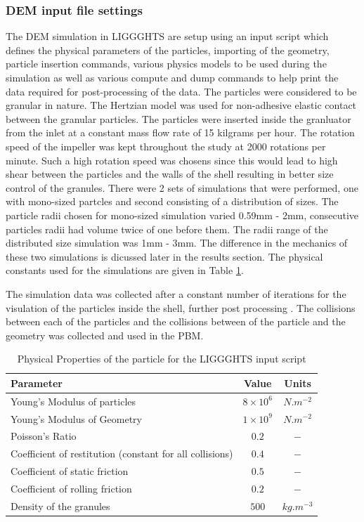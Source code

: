 \documentclass[preprint,11pt,authoryear]{elsarticle}
\begin{document}
\subsubsection{DEM input file settings}
\par The DEM simulation in LIGGGHTS are setup using an input script which defines the physical parameters of the particles, importing of the geometry, particle insertion commands, various physics models to be used during the simulation as well as various compute and dump commands to help print the data required for post-processing of the data. The particles were considered to be granular in nature. The Hertzian model was used for non-adhesive elastic contact between the granular particles. The particles were inserted inside the granluator from the inlet at a constant mass flow rate of 15 kilgrams per hour. The rotation speed of the impeller was kept throughout the study at 2000 rotations per minute. Such a high rotation speed was chosens since this would lead to high shear between the particles and the walls of the shell resulting in better size control of the granules. There were 2 sets of simulations that were performed, one with mono-sized partcles and second consisting of a distribution of sizes. The particle radii chosen for mono-sized simulation varied 0.59mm - 2mm, consecutive particles radii had volume twice of one before them. The radii range of the distributed size simulation was 1mm - 3mm. The difference in the mechanics of these two simulations is dicussed later in the results section. The physical constants used for the simulations are given in Table \ref{table:mthds_dem_input}.
\par The simulation data was collected after a constant number of iterations for the visulation of the particles inside the shell, further post processing . The collisions between each of the particles and the collisions between of the particle and the geometry was collected and used in the PBM. 

\begin{table}[!htb]%
\caption{Physical Properties of the particle for the LIGGGHTS input script} \label{table:mthds_dem_input}
\begin{center}
\begin{tabular}{l|c|c}
\hline
\bf{Parameter} &\bf{Value} &\bf{Units}\\
\hline
Young's Modulus of particles  & $8 \times 10^{6}$ & $N.m^{-2}$\\
Young's Modulus of Geometry  & $1 \times 10^{9}$ & $N.m^{-2}$\\
Poisson's Ratio & $0.2$ & $-$\\
Coefficient of restitution (constant for all collisions) & $0.4$ & $-$\\
Coefficient of static friction & $0.5$ & $-$\\
Coefficient of rolling friction  & $0.2$ & $-$\\
Density of the granules & $500$ & $kg.m^{-3}$\\
\hline
\end{tabular}
\end{center}
\end{table}
\end{document}
